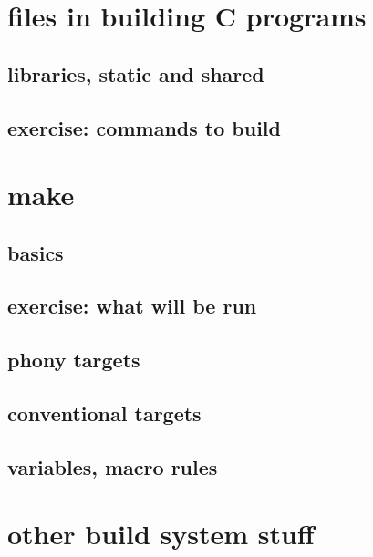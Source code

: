 
\section{files in building C programs}



\subsection{libraries, static and shared}



\subsection{exercise: commands to build}



\section{make}

\subsection{basics}



\subsection{exercise: what will be run}



\subsection{phony targets}



\subsection{conventional targets}



\subsection{variables, macro rules}



\section{other build system stuff}



